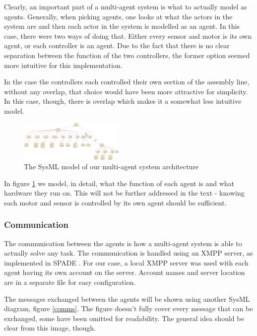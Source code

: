 \documentclass[conference]{IEEEtran}
\begin{document}
Clearly, an important part of a multi-agent system is what to actually model as agents. Generally, when picking agents, one looks at what the actors in the system are and then each actor in the system is modelled as an agent. In this case, there were two ways of doing that. Either every sensor and motor is its own agent, or each controller is an agent. Due to the fact that there is no clear separation between the function of the two controllers, the former option seemed more intuitive for this implementation.

In the case the controllers each controlled their own section of the assembly line, without any overlap, that choice would have been more attractive for simplicity. In this case, though, there is overlap which makes it a somewhat less intuitive model. 

\begin{figure}[htbp]
\centerline{\includegraphics[width=0.45\textwidth]{sysml/architecture.png}}
\caption{The SysML\cite{sysml} model of our multi-agent system architecture}
\label{architecture}
\end{figure}

In figure \ref{architecture} we model, in detail, what the function of each agent is and what hardware they run on. This will not be further addressed in the text - knowing each motor and sensor is controlled by its own agent should be sufficient. 

\subsubsection{Communication}

The communication between the agents is how a multi-agent system is able to actually solve any task. The communication is handled using an XMPP server, as implemented in SPADE \cite{SPADE}. For our case, a local XMPP server was used with each agent having its own account on the server. Account names and server location are in a separate file for easy configuration. 

The messages exchanged between the agents will be shown using another SysML\cite{sysml} diagram, figure \ref{comms}. The figure doesn't fully cover every message that can be exchanged, some have been omitted for readability. The general idea should be clear from this image, though. 
\end{document}
